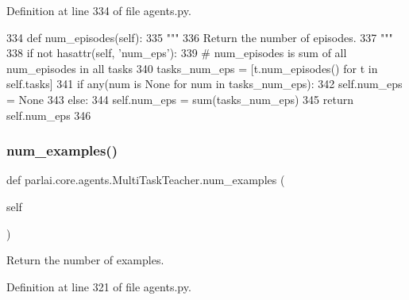 Definition at line 334 of file agents.\+py.


\begin{DoxyCode}
334     \textcolor{keyword}{def }num\_episodes(self):
335         \textcolor{stringliteral}{"""}
336 \textcolor{stringliteral}{        Return the number of episodes.}
337 \textcolor{stringliteral}{        """}
338         \textcolor{keywordflow}{if} \textcolor{keywordflow}{not} hasattr(self, \textcolor{stringliteral}{'num\_eps'}):
339             \textcolor{comment}{# num\_episodes is sum of all num\_episodes in all tasks}
340             tasks\_num\_eps = [t.num\_episodes() \textcolor{keywordflow}{for} t \textcolor{keywordflow}{in} self.tasks]
341             \textcolor{keywordflow}{if} any(num \textcolor{keywordflow}{is} \textcolor{keywordtype}{None} \textcolor{keywordflow}{for} num \textcolor{keywordflow}{in} tasks\_num\_eps):
342                 self.num\_eps = \textcolor{keywordtype}{None}
343             \textcolor{keywordflow}{else}:
344                 self.num\_eps = sum(tasks\_num\_eps)
345         \textcolor{keywordflow}{return} self.num\_eps
346 
\end{DoxyCode}
\mbox{\label{classparlai_1_1core_1_1agents_1_1MultiTaskTeacher_a21fa6d0565bd35e54a74806ecca62e34}} 
\subsubsection{\texorpdfstring{num\+\_\+examples()}{num\_examples()}}
{\footnotesize\ttfamily def parlai.\+core.\+agents.\+Multi\+Task\+Teacher.\+num\+\_\+examples (\begin{DoxyParamCaption}\item[{}]{self }\end{DoxyParamCaption})}

\begin{DoxyVerb}Return the number of examples.
\end{DoxyVerb}
 

Definition at line 321 of file agents.\+py.



